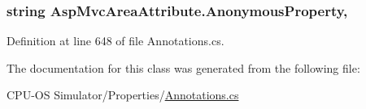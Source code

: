 \subsubsection[{Anonymous\+Property}]{\setlength{\rightskip}{0pt plus 5cm}string Asp\+Mvc\+Area\+Attribute.\+Anonymous\+Property\hspace{0.3cm}{\ttfamily [get]}, {}}\label{class_asp_mvc_area_attribute_a035e4e50658d154dfa22d68a08425a6b}


Definition at line 648 of file Annotations.\+cs.



The documentation for this class was generated from the following file\+:\begin{DoxyCompactItemize}
\item 
C\+P\+U-\/\+O\+S Simulator/\+Properties/\hyperlink{_annotations_8cs}{Annotations.\+cs}\end{DoxyCompactItemize}
